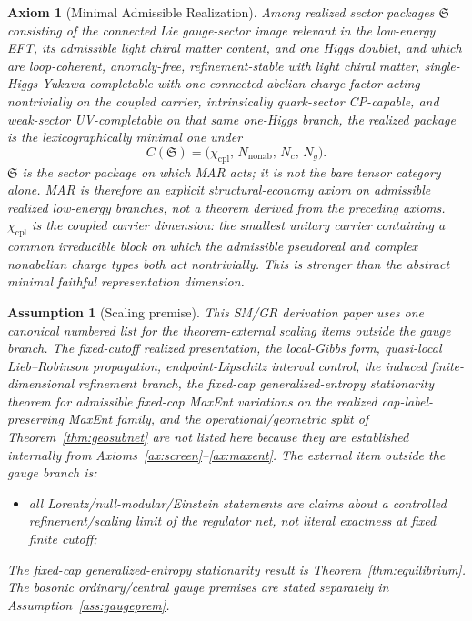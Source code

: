 \documentclass[11pt]{article}
\newtheorem{axiom}[theorem]{Axiom}
\newtheorem{assumption}[theorem]{Assumption}
\begin{document}
\begin{axiom}[Minimal Admissible Realization]\label{ax:mar}
Among realized sector packages \(\mathfrak S\) consisting of the connected Lie gauge-sector image relevant in the low-energy EFT, its admissible light chiral matter content, and one Higgs doublet, and which are loop-coherent, anomaly-free, refinement-stable with light chiral matter, single-Higgs Yukawa-completable with one connected abelian charge factor acting nontrivially on the coupled carrier, intrinsically quark-sector CP-capable, and weak-sector UV-completable on that same one-Higgs branch, the realized package is the lexicographically minimal one under
\[
C(\mathfrak S)=\bigl(\chi_{\mathrm{cpl}},\,N_{\mathrm{nonab}},\,N_c,\,N_g\bigr).
\]
\(\mathfrak S\) is the sector package on which MAR acts; it is not the bare tensor category alone. MAR is therefore an explicit structural-economy axiom on admissible realized low-energy branches, not a theorem derived from the preceding axioms. \(\chi_{\mathrm{cpl}}\) is the coupled carrier dimension: the smallest unitary carrier containing a common irreducible block on which the admissible pseudoreal and complex nonabelian charge types both act nontrivially. This is stronger than the abstract minimal faithful representation dimension.
\end{axiom}

\begin{assumption}[Scaling premise]\label{ass:technical}
This SM/GR derivation paper uses one canonical numbered list for the theorem-external scaling items outside the gauge branch. The fixed-cutoff realized presentation, the local-Gibbs form, quasi-local Lieb--Robinson propagation, endpoint-Lipschitz interval control, the induced finite-dimensional refinement branch, the fixed-cap generalized-entropy stationarity theorem for admissible fixed-cap MaxEnt variations on the realized cap-label-preserving MaxEnt family, and the operational/geometric split of Theorem~\ref{thm:geosubnet} are not listed here because they are established internally from Axioms~\ref{ax:screen}--\ref{ax:maxent}. The external item outside the gauge branch is:
\begin{itemize}[leftmargin=2.3em]
\item[\textbf{T2}] all Lorentz/null-modular/Einstein statements are claims about a controlled refinement/scaling limit of the regulator net, not literal exactness at fixed finite cutoff;
\end{itemize}
The fixed-cap generalized-entropy stationarity result is Theorem~\ref{thm:equilibrium}. The bosonic ordinary/central gauge premises are stated separately in Assumption~\ref{ass:gaugeprem}.
\end{assumption}
\end{document}
